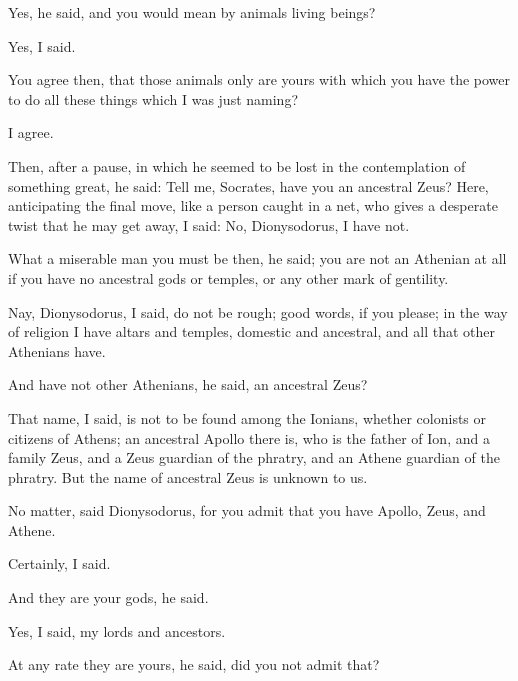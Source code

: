 \documentclass[11pt,letter]{article}
\begin{document}
\par  Yes, he said, and you would mean by animals living beings?

\par  Yes, I said.

\par  You agree then, that those animals only are yours with which you have the power to do all these things which I was just naming?

\par  I agree.

\par  Then, after a pause, in which he seemed to be lost in the contemplation of something great, he said: Tell me, Socrates, have you an ancestral Zeus? Here, anticipating the final move, like a person caught in a net, who gives a desperate twist that he may get away, I said: No, Dionysodorus, I have not.

\par  What a miserable man you must be then, he said; you are not an Athenian at all if you have no ancestral gods or temples, or any other mark of gentility.

\par  Nay, Dionysodorus, I said, do not be rough; good words, if you please; in the way of religion I have altars and temples, domestic and ancestral, and all that other Athenians have.

\par  And have not other Athenians, he said, an ancestral Zeus?

\par  That name, I said, is not to be found among the Ionians, whether colonists or citizens of Athens; an ancestral Apollo there is, who is the father of Ion, and a family Zeus, and a Zeus guardian of the phratry, and an Athene guardian of the phratry. But the name of ancestral Zeus is unknown to us.

\par  No matter, said Dionysodorus, for you admit that you have Apollo, Zeus, and Athene.

\par  Certainly, I said.

\par  And they are your gods, he said.

\par  Yes, I said, my lords and ancestors.

\par  At any rate they are yours, he said, did you not admit that?
\end{document}
